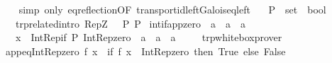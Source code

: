 \begin{isabellebody}
%
\isadelimproof
\ \ %
\endisadelimproof
%
\isatagproof
{}\isamarkupfalse%
\ {\isacharparenleft}{\kern0pt}simp\ only{\isacharcolon}{\kern0pt}\ eq{\isacharunderscore}{\kern0pt}reflection{\isacharbrackleft}{\kern0pt}OF\ transport{\isacharunderscore}{\kern0pt}id{\isachardot}{\kern0pt}left{\isacharunderscore}{\kern0pt}Galois{\isacharunderscore}{\kern0pt}eq{\isacharunderscore}{\kern0pt}left{\isacharbrackright}{\kern0pt}{\isacharparenright}{\kern0pt}%
\endisatagproof
{\isafoldproof}%
%
\isadelimproof
\isanewline
%
\endisadelimproof
\isanewline
{}\isamarkupfalse%
\isanewline
\ \ \ P\ {\isacharcolon}{\kern0pt}{\isacharcolon}{\kern0pt}\ {\isachardoublequoteopen}set\ {\isasymRightarrow}\ bool{\isachardoublequoteclose}\isanewline
\ \ \ {\isacharbrackleft}{\kern0pt}trp{\isacharunderscore}{\kern0pt}related{\isacharunderscore}{\kern0pt}intro{\isacharbrackright}{\kern0pt}{\isacharcolon}{\kern0pt}\ {\isachardoublequoteopen}{\isacharparenleft}{\kern0pt}RepZ\ {\isasymRrightarrow}\ {\isacharparenleft}{\kern0pt}{\isacharequal}{\kern0pt}{\isacharparenright}{\kern0pt}{\isacharparenright}{\kern0pt}\ P\ P{\isachardoublequoteclose}\isanewline
{}\isanewline
\isanewline
\isanewline
{}\isamarkupfalse%
\ int{\isacharunderscore}{\kern0pt}if{\isacharunderscore}{\kern0pt}app{\isacharunderscore}{\kern0pt}zero\ {\isacharcolon}{\kern0pt}{\isacharcolon}{\kern0pt}\ {\isachardoublequoteopen}{\isacharprime}{\kern0pt}a\ {\isasymRightarrow}\ {\isacharprime}{\kern0pt}a\ {\isasymRightarrow}\ {\isacharprime}{\kern0pt}a{\isachardoublequoteclose}\isanewline
\ \ \ x\ {\isacharequal}{\kern0pt}\ {\isachardoublequoteopen}Int{\isacharunderscore}{\kern0pt}Rep{\isacharunderscore}{\kern0pt}if\ P\ Int{\isacharunderscore}{\kern0pt}Rep{\isacharunderscore}{\kern0pt}zero\ {\isacharcolon}{\kern0pt}{\isacharcolon}{\kern0pt}\ {\isacharprime}{\kern0pt}a\ {\isasymRightarrow}\ {\isacharprime}{\kern0pt}a\ {\isasymRightarrow}\ {\isacharprime}{\kern0pt}a{\isachardoublequoteclose}\ {\isacharbang}{\kern0pt}\isanewline
%
\isadelimproof
\ \ %
\endisadelimproof
%
\isatagproof
{}\isamarkupfalse%
\ trp{\isacharunderscore}{\kern0pt}whitebox{\isacharunderscore}{\kern0pt}prover%
\endisatagproof
{\isafoldproof}%
%
\isadelimproof
\isanewline
%
\endisadelimproof
\isanewline
{}\isamarkupfalse%
\isanewline
\isanewline
{}\isamarkupfalse%
\ {\isachardoublequoteopen}app{\isacharunderscore}{\kern0pt}eq{\isacharunderscore}{\kern0pt}Int{\isacharunderscore}{\kern0pt}Rep{\isacharunderscore}{\kern0pt}zero\ f\ x\ {\isasymequiv}\ if\ f\ x\ {\isacharequal}{\kern0pt}\ Int{\isacharunderscore}{\kern0pt}Rep{\isacharunderscore}{\kern0pt}zero\ then\ True\ else\ False{\isachardoublequoteclose}\isanewline

\end{isabellebody}
